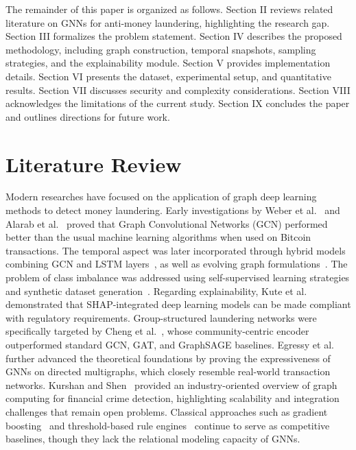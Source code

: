 \documentclass[conference]{IEEEtran}
\begin{document}
The remainder of this paper is organized as follows. Section II reviews related literature on GNNs for anti‑money laundering, highlighting the research gap. Section III formalizes the problem statement. Section IV describes the proposed methodology, including graph construction, temporal snapshots, sampling strategies, and the explainability module. Section V provides implementation details. Section VI presents the dataset, experimental setup, and quantitative results. Section VII discusses security and complexity considerations. Section VIII acknowledges the limitations of the current study. Section IX concludes the paper and outlines directions for future work.

\section{Literature Review}

Modern researches have focused on the application of graph deep learning methods to detect money laundering. Early investigations by Weber et al.~\cite{weber2019} and Alarab et al.~\cite{alarab2020} proved that Graph Convolutional Networks (GCN) performed better than the usual machine learning algorithms when used on Bitcoin transactions. The temporal aspect was later incorporated through hybrid models combining GCN and LSTM layers~\cite{alarab2022, wan2024}, as well as evolving graph formulations~\cite{pareja2020}. The problem of class imbalance was addressed using self-supervised learning strategies and synthetic dataset generation~\cite{altman2023}. Regarding explainability, Kute et al.~\cite{kute2021} demonstrated that SHAP-integrated deep learning models can be made compliant with regulatory requirements. Group-structured laundering networks were specifically targeted by Cheng et al.~\cite{cheng2023}, whose community-centric encoder outperformed standard GCN, GAT, and GraphSAGE baselines. Egressy et al.~\cite{egressy2024} further advanced the theoretical foundations by proving the expressiveness of GNNs on directed multigraphs, which closely resemble real-world transaction networks. Kurshan and Shen~\cite{kurshan2021} provided an industry-oriented overview of graph computing for financial crime detection, highlighting scalability and integration challenges that remain open problems. Classical approaches such as gradient boosting~\cite{vassallo2021} and threshold-based rule engines~\cite{jullum2020} continue to serve as competitive baselines, though they lack the relational modeling capacity of GNNs.
\end{document}
